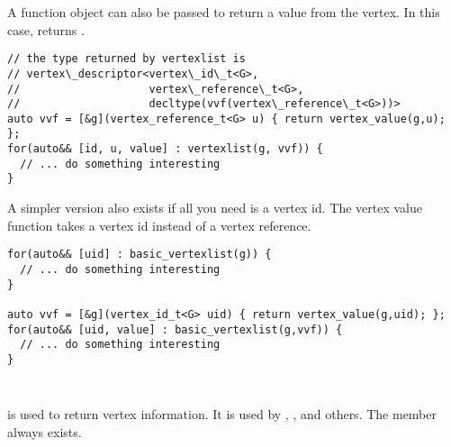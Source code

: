 A function object can also be passed to return a value from the vertex. In this case,  returns .
\begin{lstlisting}
// the type returned by vertexlist is 
// vertex\_descriptor<vertex\_id\_t<G>, 
//                    vertex\_reference\_t<G>, 
//                    decltype(vvf(vertex\_reference\_t<G>))>
auto vvf = [&g](vertex_reference_t<G> u) { return vertex_value(g,u); };
for(auto&& [id, u, value] : vertexlist(g, vvf)) {
  // ... do something interesting
}
\end{lstlisting}

A simpler version also exists if all you need is a vertex id. The vertex value function takes a vertex id
instead of a vertex reference.
\begin{lstlisting}
for(auto&& [uid] : basic_vertexlist(g)) {
  // ... do something interesting
}

auto vvf = [&g](vertex_id_t<G> uid) { return vertex_value(g,uid); };
for(auto&& [uid, value] : basic_vertexlist(g,vvf)) {
  // ... do something interesting
}
\end{lstlisting}

\subsubsection{}\label{vertex-view}\mbox{} \\
 is used to return vertex information. It is used by , , 
 and others. The  member always exists.

{\small
     
}

